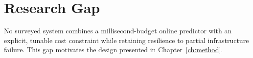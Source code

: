 \section{Research Gap}
No surveyed system combines a millisecond-budget online predictor with an explicit, tunable cost constraint while retaining resilience to partial infrastructure failure. This gap motivates the design presented in Chapter~\ref{ch:method}.
